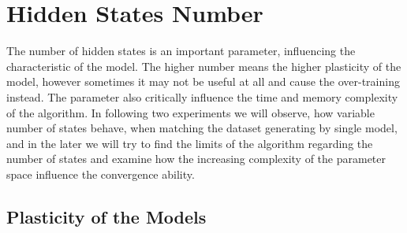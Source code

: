 \documentclass[thesis=M,english]{FITthesis}[2012/10/20]
\begin{document}
\section{Hidden States Number}

The number of hidden states is an important parameter, influencing the characteristic of the model. The higher number means the higher plasticity of the model, however sometimes it may not be useful at all and cause the over-training instead. The parameter also critically influence the time and memory complexity of the algorithm. In following two experiments we will observe, how variable number of states behave, when matching the dataset generating by single model, and in the later we will try to find the limits of the algorithm regarding the number of states and examine how the increasing complexity of the parameter space influence the convergence ability.    

\subsection{Plasticity of the Models}
\end{document}
